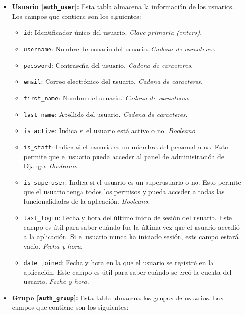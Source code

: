 \begin{itemize}
    \item \textbf{Usuario [\texttt{auth\_user}]:} Esta tabla almacena la información de los usuarios. Los campos que contiene son los siguientes:
          \begin{itemize}
              \item \texttt{id}: Identificador único del usuario. \textit{Clave primaria (entero)}.
              \item \texttt{username}: Nombre de usuario del usuario. \textit{Cadena de caracteres}.
              \item \texttt{password}: Contraseña del usuario. \textit{Cadena de caracteres}.
              \item \texttt{email}: Correo electrónico del usuario. \textit{Cadena de caracteres}.
              \item \texttt{first\_name}: Nombre del usuario. \textit{Cadena de caracteres}.
              \item \texttt{last\_name}: Apellido del usuario. \textit{Cadena de caracteres}.
              \item \texttt{is\_active}: Indica si el usuario está activo o no. \textit{Booleano}.
              \item \texttt{is\_staff}: Indica si el usuario es un miembro del personal o no. Esto permite que el usuario pueda acceder al panel de administración de Django. \textit{Booleano}.
              \item \texttt{is\_superuser}: Indica si el usuario es un superusuario o no. Esto permite que el usuario tenga todos los permisos y pueda acceder a todas las funcionalidades de la aplicación. \textit{Booleano}.
              \item \texttt{last\_login}: Fecha y hora del último inicio de sesión del usuario. Este campo es útil para saber cuándo fue la última vez que el usuario accedió a la aplicación. Si el usuario nunca ha iniciado sesión, este campo estará vacío. \textit{Fecha y hora}.
              \item \texttt{date\_joined}: Fecha y hora en la que el usuario se registró en la aplicación. Este campo es útil para saber cuándo se creó la cuenta del usuario. \textit{Fecha y hora}.
          \end{itemize}
    \item \textbf{Grupo [\texttt{auth\_group}]:} Esta tabla almacena los grupos de usuarios. Los campos que contiene son los siguientes:
          \begin{itemize}

\end{itemize}
\end{itemize}
